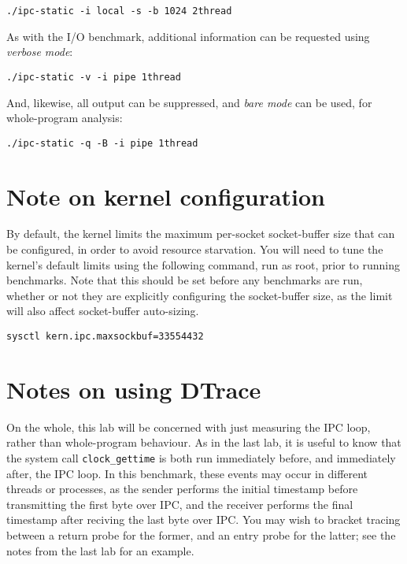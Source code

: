 \documentclass[a4paper,10pt]{article}
\begin{document}
\begin{verbatim}
./ipc-static -i local -s -b 1024 2thread
\end{verbatim}

\noindent
As with the I/O benchmark, additional information can be requested using
\textit{verbose mode}:

\begin{verbatim}
./ipc-static -v -i pipe 1thread
\end{verbatim}

\noindent
And, likewise, all output can be suppressed, and \textit{bare mode} can be
used, for whole-program analysis:

\begin{verbatim}
./ipc-static -q -B -i pipe 1thread
\end{verbatim}

\section*{Note on kernel configuration}

By default, the kernel limits the maximum per-socket socket-buffer size that
can be configured, in order to avoid resource starvation.
You will need to tune the kernel's default limits using the following command,
run as root, prior to running benchmarks.
Note that this should be set before any benchmarks are run, whether or not
they are explicitly configuring the socket-buffer size, as the limit will also
affect socket-buffer auto-sizing.

\begin{verbatim}
sysctl kern.ipc.maxsockbuf=33554432
\end{verbatim}

\section*{Notes on using DTrace}

On the whole, this lab will be concerned with just measuring the IPC loop,
rather than whole-program behaviour.
As in the last lab, it is useful to know that the system call
\texttt{clock\_gettime} is both run immediately before, and immediately after,
the IPC loop.
In this benchmark, these events may occur in different threads or processes,
as the sender performs the initial timestamp before transmitting the first
byte over IPC, and the receiver performs the final timestamp after reciving
the last byte over IPC.
You may wish to bracket tracing between a return probe for the former, and an
entry probe for the latter; see the notes from the last lab for an example.
\end{document}
